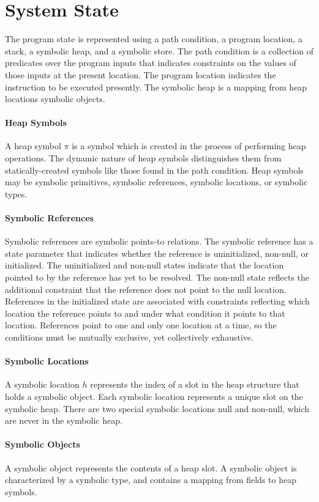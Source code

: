 \section{System State}
The program state is represented using a path condition, a program location, a stack, a symbolic heap, and a symbolic store. The path condition is a collection of predicates over the program inputs that indicates constraints on the values of those inputs at the present location. The program location indicates the instruction to be executed presently. The symbolic heap is a mapping from heap locations symbolic objects. 
\paragraph{Heap Symbols}
A heap symbol $\pi$ is a symbol which is created in the process of performing heap operations. The dynamic nature of heap symbols distinguishes them from statically-created symbols like those found in the path condition. Heap symbols may be symbolic primitives, symbolic references, symbolic locations, or symbolic types.
\paragraph{Symbolic References}
Symbolic references are symbolic points-to relations. The symbolic reference has a state parameter that indicates whether the reference is uninitialized, non-null, or initialized. The uninitialized and non-null states indicate that the location pointed to by the reference has yet to be resolved. The non-null state reflects the additional constraint that the reference does not point to the null location. References in the initialized state are associated with constraints reflecting which location the reference points to and under what condition it points to that location. References point to one and only one location at a time, so the conditions must be mutually exclusive, yet collectively exhaustive.
\paragraph{Symbolic Locations}
A symbolic location $h$ represents the index of a slot in the heap structure that holds a symbolic object. Each symbolic location represents a unique slot on the symbolic heap. There are two special symbolic locations null and non-null, which are never in the symbolic heap.
\paragraph{Symbolic Objects}
A symbolic object represents the contents of a heap slot. A symbolic object is characterized by a symbolic type, and contains a mapping from fields to heap symbols.
